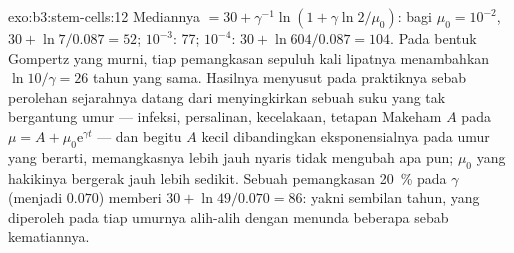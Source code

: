 \begin{solution}{exo:b3:stem-cells:12}
Mediannya $= 30 + \gamma^{-1}\ln(1 + \gamma\ln 2/\mu_{0})$: bagi $\mu_{0} =
10^{-2}$, $30 + \ln 7/0.087 = 52$; $10^{-3}$: 77; $10^{-4}$: $30 +
\ln 604/0.087 = 104$. Pada bentuk Gompertz yang murni, tiap pemangkasan sepuluh kali lipatnya menambahkan
$\ln 10/\gamma = 26$ tahun yang sama. Hasilnya menyusut pada praktiknya
sebab perolehan sejarahnya datang dari menyingkirkan sebuah suku yang tak bergantung umur
--- infeksi, persalinan, kecelakaan, tetapan Makeham $A$ pada $\mu = A
+ \mu_{0}\mathrm{e}^{\gamma t}$ --- dan begitu $A$ kecil dibandingkan
eksponensialnya pada umur yang berarti, memangkasnya lebih jauh nyaris tidak mengubah
apa pun; $\mu_{0}$ yang hakikinya bergerak jauh lebih sedikit. Sebuah pemangkasan \qty{20}{\%}
pada $\gamma$ (menjadi $0.070$) memberi $30 + \ln 49/0.070 = 86$: yakni sembilan tahun,
yang diperoleh pada tiap umurnya alih-alih dengan menunda beberapa sebab kematiannya.
\end{solution}


